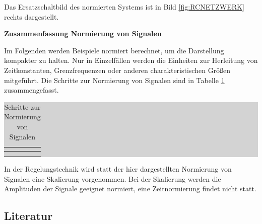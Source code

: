 \noindent Das Ersatzschaltbild des normierten Systems ist in Bild \ref{fig:RCNETZWERK} rechts dargestellt.

\bigskip

{\selectfont
\noindent\textbf{Zusammenfassung Normierung von Signalen}} \smallskip

\noindent Im Folgenden werden Beispiele normiert berechnet, um die Darstellung kompakter zu halten. Nur in Einzelfällen werden die Einheiten zur Herleitung von Zeitkonstanten, Grenzfrequenzen oder anderen charakteristischen Größen mitgeführt. Die Schritte zur Normierung von Signalen sind in Tabelle \ref{tab:twosix} zusammengefasst.

{\selectfont
\noindent\textbf{}} \smallskip

\medskip
\begin{table}[H]
\setlength{\arrayrulewidth}{.1em}
\caption{Schritte zur Normierung von Signalen}
\setlength{\fboxsep}{0pt}%
\colorbox{lightgray}{%
%
\begin{tabular}{| c | c |}
\hline
\parbox[c][0.28in][c]{3.3in}{\smallskip\centering\textbf{\selectfont{Normierung}}} & \parbox[c][0.28in][c]{3.3in}{\smallskip\centering\textbf{\selectfont{Mathematische Beschreibung}}}\\ \hline

\parbox[c][0.64in][c]{3.3in}{} & 
\parbox[c][0.64in][c]{3.3in}{}\\ \hline

\parbox[c][0.64in][c]{3.3in}{} & \parbox[c][0.64in][c]{3.3in}{}\\
\end{tabular}%
}
\label{tab:twosix}
\end{table}

\bigskip

\noindent In der Regelungstechnik wird statt der hier dargestellten Normierung von Signalen eine Skalierung vorgenommen. Bei der Skalierung werden die Amplituden der Signale geeignet normiert, eine Zeitnormierung findet nicht statt.

\clearpage



\subsection{ Literatur}


